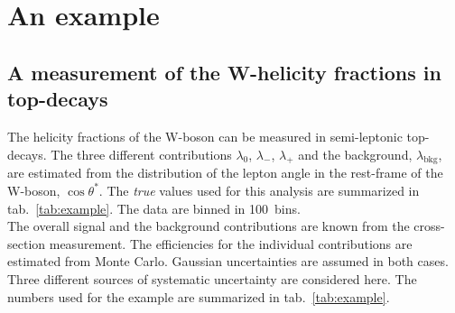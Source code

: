 \documentclass[11pt, a4paper]{article}
\begin{document}
\clearpage
\pagebreak


\section{An example}
\label{section:example}

\subsection{A measurement of the W-helicity fractions in top-decays} 

The helicity fractions of the W-boson can be measured in semi-leptonic
top-decays. The three different contributions $\lambda_{0}$,
$\lambda_{-}$, $\lambda_{+}$ and the background,
$\lambda_{\mathrm{bkg}}$, are estimated from the distribution of the
lepton angle in the rest-frame of the W-boson, $\cos \theta^{*}$. The
{\it true} values used for this analysis are summarized in
tab.~\ref{tab:example}. The data are binned in 100~bins. \\

The overall signal and the background contributions are known from the
cross-section measurement. The efficiencies for the individual
contributions are estimated from Monte Carlo. Gaussian uncertainties
are assumed in both cases. Three different sources of systematic
uncertainty are considered here. The numbers used for the example are
summarized in tab.~\ref{tab:example}. \\
\end{document}
